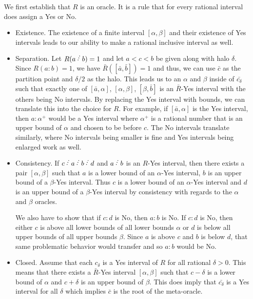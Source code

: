 \documentclass[12pt]{article}
\begin{document}
We first establish that $R$ is an oracle. It is a rule that for every rational interval does assign a Yes or No. 
\begin{itemize}
    \item Existence. The existence of a finite interval $[\alpha, \beta]$ and their existence of Yes intervals leads to our ability to make a rational inclusive interval as well. 
    
    \item Separation. Let $R(a\lte b) = 1$ and let $a < c < b$ be given along with halo $\delta$. Since $R(a:b)= 1$, we have $\bar{R}([\bar{a}, \bar{b}]) = 1$ and  thus, we can use $\bar{c}$ as the partition point and $\delta/2$ as the halo. This leads us to an $\alpha$ and $\beta$ inside of $\bar{c_\delta}$ such that exactly one of $[\bar{a},\alpha]$, $[\alpha, \beta]$, $[\beta, \bar{b}]$ is an $\bar{R}$-Yes interval with the others being No intervals. By replacing the Yes interval with bounds, we can translate this into the choice for $R$. For example, if $[\bar{a}, \alpha]$ is the Yes interval, then $a:\alpha^+$ would be a Yes interval where $\alpha^+$ is a rational number that is an upper bound of $\alpha$ and chosen to be before $c$. The No intervals translate similarly, where No intervals being smaller is fine and Yes intervals being enlarged work as well. 

    
    \item Consistency. If $c\lte a \lte b \lte d$ and $a \lte b$ is an $R$-Yes interval, then there exists a pair $[\alpha, \beta]$ such that $a$ is a lower bound of an $\alpha$-Yes interval, $b$ is an upper bound of a $\beta$-Yes interval. Thus $c$ is a lower bound of an $\alpha$-Yes interval and $d$ is an upper bound of a $\beta$-Yes interval by consistency with regards to the $\alpha$ and $\beta$ oracles. 
    
    We also have to show that if $c:d$ is No, then $a:b$ is No. If $c:d$ is No, then either $c$ is above all lower bounds of all lower bounds $\alpha$ or $d$ is below all upper bounds of all upper bounds $\beta$. Since $a$ is above $c$ and $b$ is below $d$, that same problematic behavior would transfer and so $a:b$ would be No. 
    \item Closed. Assume that each $c_\delta$ is a Yes interval of $R$ for all rational $\delta >0$. This means that there exists a $\bar{R}$-Yes interval $[\alpha, \beta]$ such that $c-\delta$ is a lower bound of $\alpha$ and $c+\delta$ is an upper bound of $\beta$. This does imply that $\bar{c_\delta}$ is a Yes interval for all $\delta$ which implies $\bar{c}$ is the root of the meta-oracle. 


\end{itemize}
\end{document}
